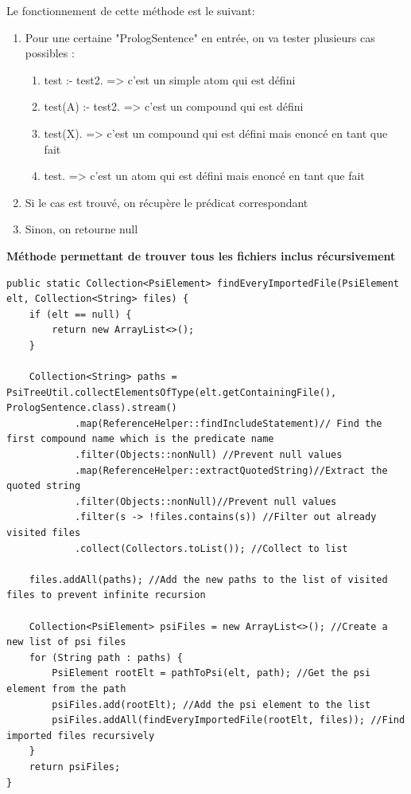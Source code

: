 \noindent Le fonctionnement de cette méthode est le suivant:
\begin{enumerate}
    \item Pour une certaine "PrologSentence" en entrée, on va tester plusieurs cas possibles :
    \begin{enumerate}
        \item test :- test2. => c'est un simple atom qui est défini
        \item test(A) :- test2. => c'est un compound qui est défini
        \item test(X). => c'est un compound qui est défini mais enoncé en tant que fait
        \item test. => c'est un atom qui est défini mais enoncé en tant que fait
    \end{enumerate}
    \item Si le cas est trouvé, on récupère le prédicat correspondant
    \item Sinon, on retourne null
\end{enumerate}
\textbf{Méthode permettant de trouver tous les fichiers inclus récursivement}
\begin{lstlisting}[label={lst:method_find_all_included_files}, caption={Méthode permettant de trouver tous les fichiers inclus récursivement}]
public static Collection<PsiElement> findEveryImportedFile(PsiElement elt, Collection<String> files) {
    if (elt == null) {
        return new ArrayList<>();
    }

    Collection<String> paths = PsiTreeUtil.collectElementsOfType(elt.getContainingFile(), PrologSentence.class).stream()
            .map(ReferenceHelper::findIncludeStatement)// Find the first compound name which is the predicate name
            .filter(Objects::nonNull) //Prevent null values
            .map(ReferenceHelper::extractQuotedString)//Extract the quoted string
            .filter(Objects::nonNull)//Prevent null values
            .filter(s -> !files.contains(s)) //Filter out already visited files
            .collect(Collectors.toList()); //Collect to list

    files.addAll(paths); //Add the new paths to the list of visited files to prevent infinite recursion

    Collection<PsiElement> psiFiles = new ArrayList<>(); //Create a new list of psi files
    for (String path : paths) {
        PsiElement rootElt = pathToPsi(elt, path); //Get the psi element from the path
        psiFiles.add(rootElt); //Add the psi element to the list
        psiFiles.addAll(findEveryImportedFile(rootElt, files)); //Find imported files recursively
    }
    return psiFiles;
}
\end{lstlisting}

